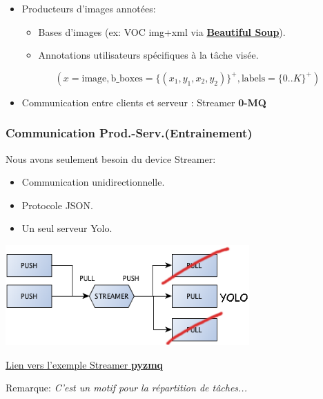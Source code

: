 \documentclass[11pt]{beamer}
\begin{document}
\begin{frame}
\begin{itemize}
\pause
\item Producteurs d'images annotées:
\begin{itemize}
\item Bases d'images (ex: VOC img+xml via \href{https://www.crummy.com/software/BeautifulSoup/}{\textbf{Beautiful Soup}}).
\item Annotations utilisateurs spécifiques à la tâche visée.
\end{itemize}
$$(x = \mbox{image},  \mbox{b\_boxes} = \{(x_1, y_1, x_2, y_2)\}^+, \mbox{labels} = \{0..K\}^+)$$
\end{itemize}
\vspace{-4mm}
\begin{itemize}
\item Communication entre clients et serveur : Streamer \textbf{0-MQ}
\end{itemize}
\end{frame}


\begin{frame}
\frametitle{Communication Prod.-Serv.(Entrainement)}
Nous avons seulement besoin du device Streamer:
\begin{itemize}
\item Communication unidirectionnelle.
\item Protocole JSON.
\item Un seul serveur Yolo.
\end{itemize}
 \begin{center}
     \includegraphics[width=0.7\textwidth]{images/Streamer_YOLO.png}
     \end{center}
\begin{flushright}
\href{http://learning-0mq-with-pyzmq.readthedocs.io/en/latest/pyzmq/devices/streamer.html}{Lien vers l'exemple Streamer \textbf{pyzmq}}
\end{flushright}
\vspace{-2mm}Remarque: \emph{C'est un motif pour la répartition de tâches...}
\end{frame}
\end{document}
